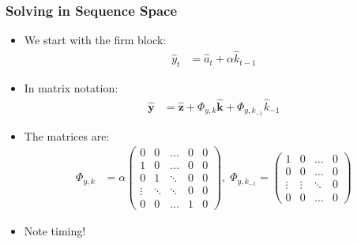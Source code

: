 \documentclass[english,xcolor=svgnames]{beamer}
\begin{document}
	\begin{frame}
    \frametitle{Solving in Sequence Space}
		\begin{itemize}
			\item We start with the firm block:
			\begin{align*}
				\hat{y}_t&=\hat{a}_t +\alpha \hat{k}_{t-1} 
			\end{align*}
			\item In matrix notation:
			\begin{align*}
				\mathbf{\hat{y}} &= \mathbf{\hat{z}} + \Phi_{y,k}\mathbf{\hat{k}} + \Phi_{y,k_{-1}}\hat{k}_{-1}
			\end{align*}
			\item The matrices are:
			\begin{align*}
				\Phi_{y,k}&=\alpha \begin{pmatrix} 
					0 & 0 & \hdots & 0 & 0 \\
					1 & 0 & \hdots & 0 & 0 \\
					0 & 1 & \ddots & 0 & 0 \\
					\vdots & \ddots & \ddots & 0 & 0 \\
					0 & 0 & \hdots & 1 & 0
				\end{pmatrix},\; 
				\Phi_{y,k_{-1}}=\begin{pmatrix}
					1 & 0 & \hdots & 0 \\
					0 & 0 & \hdots & 0 \\
					\vdots & \vdots & \ddots & 0 \\
					0 & 0 & \hdots & 0
				\end{pmatrix}
			\end{align*}
			\item Note timing!
		\end{itemize}
\end{frame}
	
\end{document}
